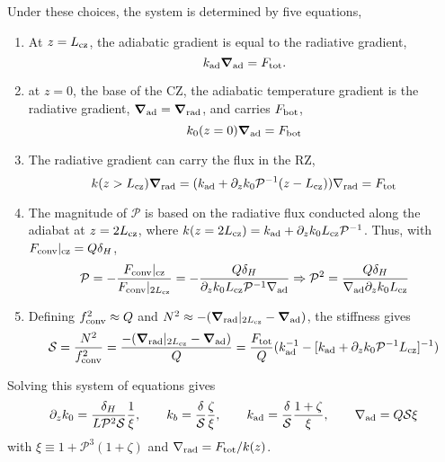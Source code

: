 \documentclass[12pt,preprint]{article}
\newcommand{\gradrad}{\ensuremath{\nabla_{\rm{rad}}}}
\newcommand{\gradad}{\ensuremath{\nabla_{\rm{ad}}}}
\newcommand{\Fconv}{\ensuremath{F_{\rm{conv}}}}
\newcommand{\mP}{\ensuremath{\mathcal{P}}}
\newcommand{\mS}{\ensuremath{\mathcal{S}}}
\renewcommand{\vec}[1]{\boldsymbol{#1}}
\newcommand{\grad}{\vec{\nabla}}
\begin{document}
Under these choices, the system is determined by five equations,
\begin{enumerate}
\item At $z = L_{\rm{cz}}$, the adiabatic gradient is equal to the radiative gradient,
\begin{equation}
k_{\rm{ad}}\grad_{\rm{ad}} = F_{\rm{tot}}.
\end{equation}
\item at $z = 0$, the base of the CZ, the adiabatic temperature gradient is the radiative gradient, $\grad_{\rm{ad}} = \grad_{\rm{rad}}$, and carries $F_{\rm{bot}}$,
\begin{equation}
k_0(z=0) \grad_{\rm{ad}} = F_{\rm{bot}}
\end{equation}
\item The radiative gradient can carry the flux in the RZ,
\begin{equation}
k(z > L_{\rm{cz}}) \grad_{\rm{rad}} = (k_{\rm{ad}} + \partial_z k_0 \mP^{-1}(z - L_{\rm{cz}}))\gradrad = F_{\rm{tot}}
\end{equation}
\item The magnitude of $\mP$ is based on the radiative flux conducted along the adiabat at $z = 2 L_{\rm{cz}}$, where $k(z=2L_{\rm{cz}}) = k_{\rm{ad}} + \partial_z k_0 L_{\rm{cz}}\mP^{-1}$.
Thus, with $\Fconv|_{\rm{cz}} = Q\delta_H$,
\begin{equation}
\mP = -\frac{\Fconv|_{\rm{cz}}}{\Fconv|_{2L_{\rm{cz}}}}
= -\frac{Q\delta_H}{\partial_z k_0 L_{\rm{cz}}\mP^{-1}\gradad}
\Rightarrow
\mP^2 = \frac{Q \delta_H}{\gradad \partial_z k_0 L_{\rm{cz}}}
\end{equation}
\item Defining $f_{\rm{conv}}^2 \approx Q$ and $N^2 \approx -(\grad_{\rm{rad}}|_{2L_{\rm{cz}}} - \grad_{\rm{ad}})$, the stiffness gives
\begin{equation}
\mS = \frac{N^2}{f_{\mathrm{conv}}^2} = \frac{-(\grad_{\rm{rad}}|_{2L_{\rm{cz}}} - \grad_{\rm{ad}})}{Q}
= \frac{F_{\mathrm{tot}}}{Q}(k_{\rm{ad}}^{-1} - [k_{\rm{ad}} + \partial_z k_0 \mP^{-1} L_{\rm{cz}}]^{-1})
\end{equation}
\end{enumerate}

Solving this system of equations gives
\begin{align}
\partial_z k_0 = \frac{\delta_H}{L \mP^2 \mS}\frac{1}{\xi},\qquad
k_b = \frac{\delta }{\mS}\frac{\zeta}{\xi},\qquad
k_{\rm{ad}} = \frac{\delta}{\mS}\frac{1 + \zeta}{\xi},\qquad
\gradad = Q \mS \xi 
\end{align}
with $\xi \equiv 1 + \mP^3(1 + \zeta)$ and $\gradrad = F_{\rm{tot}}/k(z)$.
\end{document}
